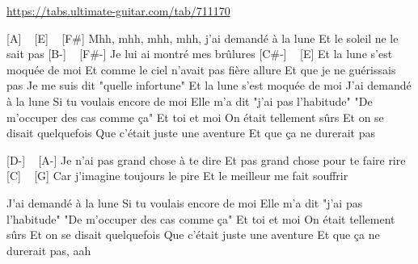
\url{https://tabs.ultimate-guitar.com/tab/711170}

\begin{guitar}

[A] ~ [E] ~ [F#]
Mhh, mhh, mhh, mhh, j'ai demandé à la lune
Et le soleil ne le sait pas
[B-] ~ [F#-]
Je lui ai montré mes brûlures
[C#-] ~ [E]
Et la lune s'est moquée de moi
Et comme le ciel n'avait pas fière allure
Et que je ne guérissais pas
Je me suis dit "quelle infortune"
Et la lune s'est moquée de moi
J'ai demandé à la lune
Si tu voulais encore de moi
Elle m'a dit "j'ai pas l'habitude"
"De m'occuper des cas comme ça"
Et toi et moi
On était tellement sûrs
Et on se disait quelquefois
Que c'était juste une aventure
Et que ça ne durerait pas

[D-] ~ [A-]
Je n'ai pas grand chose à te dire
Et pas grand chose pour te faire rire
[C] ~ [G]
Car j'imagine toujours le pire
Et le meilleur me fait souffrir

J'ai demandé à la lune
Si tu voulais encore de moi
Elle m'a dit "j'ai pas l'habitude"
"De m'occuper des cas comme ça"
Et toi et moi
On était tellement sûrs
Et on se disait quelquefois
Que c'était juste une aventure
Et que ça ne durerait pas, aah

\end{guitar}